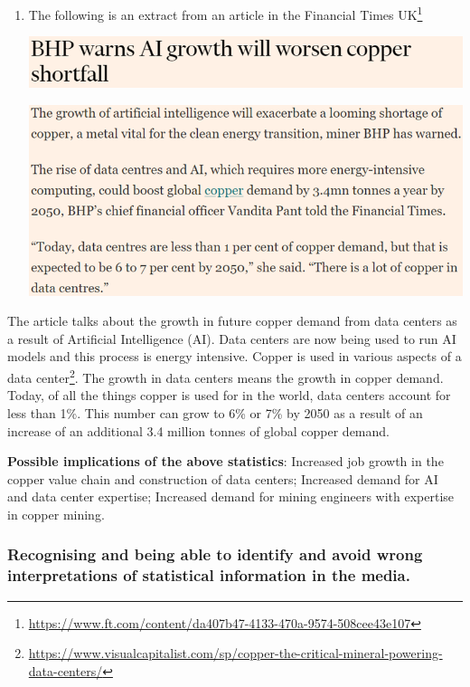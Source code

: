 \documentclass[
]{book}
\begin{document}
\begin{enumerate}
\def\labelenumi{\arabic{enumi}.}
\item
  The following is an extract from an article in the Financial Times UK\footnote{\url{https://www.ft.com/content/da407b47-4133-470a-9574-508cee43e107}}

  \includegraphics[width=5.20833in,height=\textheight]{images/clipboard-712778398.png}

  \includegraphics[width=5.20833in,height=\textheight]{images/clipboard-4056060037.png}
\end{enumerate}

The article talks about the growth in future copper demand from data centers as a result of Artificial Intelligence (AI). Data centers are now being used to run AI models and this process is energy intensive. Copper is used in various aspects of a data center\footnote{\url{https://www.visualcapitalist.com/sp/copper-the-critical-mineral-powering-data-centers/}}. The growth in data centers means the growth in copper demand. Today, of all the things copper is used for in the world, data centers account for less than 1\%. This number can grow to 6\% or 7\% by 2050 as a result of an increase of an additional 3.4 million tonnes of global copper demand.

\textbf{Possible implications of the above statistics}: Increased job growth in the copper value chain and construction of data centers; Increased demand for AI and data center expertise; Increased demand for mining engineers with expertise in copper mining.

\subsubsection{Recognising and being able to identify and avoid wrong interpretations of statistical information in the media.}\label{recognising-and-being-able-to-identify-and-avoid-wrong-interpretations-of-statistical-information-in-the-media.}
\end{document}
